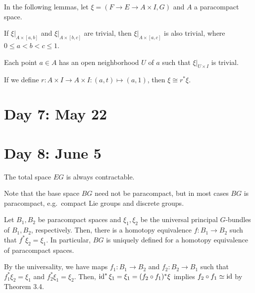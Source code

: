 \documentclass{../../../small}
\begin{document}
In the following lemmas, let $\xi=(F\to E\to A\times I,G)$ and $A$ a paracompact space.
\begin{lem*}[Step 1 of 3.2]
If $\xi|_{A\times[a,b]}$ and $\xi|_{A\times[b,c]}$ are trivial, then $\xi|_{A\times[a,c]}$ is also trivial, where $0\le a<b<c\le1$.
\end{lem*}
\begin{pf}
	
\end{pf}

\begin{lem*}[Step 2 of 3.2]
Each point $a\in A$ has an open neighborhood $U$ of $a$ such that $\xi|_{U\times I}$ is trivial.
\end{lem*}
\begin{pf}
	
\end{pf}

\begin{lem*}[Step 3 of 3.2]
If we define $r:A\times I\to A\times I:(a,t)\mapsto(a,1)$, then $\xi\cong r^*\xi$.
\end{lem*}
\begin{pf}
	
\end{pf}


\newpage
\section{Day 7: May 22}

\newpage
\section{Day 8: June 5}
The total space $EG$ is always contractable.

Note that the base space $BG$ need not be paracompact, but in most cases $BG$ is paracompact, e.g.~compact Lie groups and discrete groups.

\begin{prop*}[3.7]
Let $B_1,B_2$ be paracompact spaces and $\xi_1,\xi_2$ be the universal principal $G$-bundles of $B_1,B_2$, respectively.
Then, there is a homotopy equivalence $f:B_1\to B_2$ such that $f^*\xi_2=\xi_1$.
In particular, $BG$ is uniquely defined for a homotopy equivalence of paracompact spaces.
\end{prop*}
\begin{pf}
By the universality, we have maps $f_1:B_1\to B_2$ and $f_2:B_2\to B_1$ such that $f_1^*\xi_2=\xi_1$ and $f_2^*\xi_1=\xi_2$.
Then, $\operatorname{id}^*\xi_1=\xi_1=(f_2\circ f_1)^*\xi$ implies $f_2\circ f_1\simeq\operatorname{id}$ by Theorem 3.4.
\end{pf}
\end{document}
